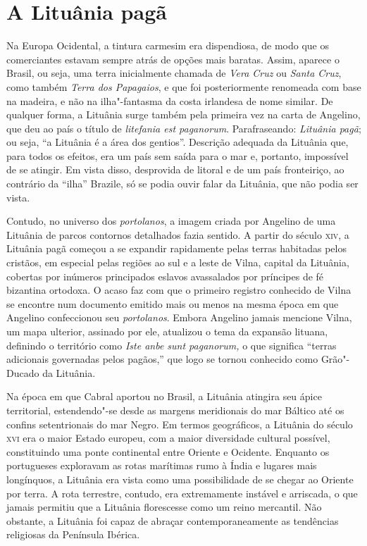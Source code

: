 \section*{A Lituânia pagã}

Na Europa
Ocidental, a tintura carmesim era dispendiosa, de modo que os
comerciantes estavam sempre atrás de opções mais baratas. Assim, aparece
o Brasil, ou seja, uma terra inicialmente chamada de \textit{Vera Cruz} ou
\textit{Santa Cruz}, como também \textit{Terra dos Papagaios}, e que foi
posteriormente renomeada com base na madeira, e não na ilha"-fantasma da
costa irlandesa de nome similar. De qualquer forma, a Lituânia surge
também pela primeira vez na carta de Angelino, que deu ao país o título
de \textit{litefania est paganorum}. Parafraseando: \textit{Lituânia
pagã}; ou seja, ``a Lituânia é a área dos gentios''. Descrição
adequada da Lituânia que, para todos os efeitos, era um país sem saída
para o mar e, portanto, impossível de se atingir. Em vista disso,
desprovida de litoral e de um país fronteiriço, ao contrário da ``ilha''
Brazile, só se podia ouvir falar da Lituânia, que não podia ser vista.

Contudo, no universo dos \textit{portolanos}, a imagem criada por Angelino de uma
Lituânia de parcos contornos detalhados fazia sentido. A partir do
século \textsc{xiv}, a Lituânia pagã começou a se expandir rapidamente pelas
terras habitadas pelos cristãos, em especial pelas regiões ao sul e a
leste de Vilna, capital da Lituânia, cobertas por inúmeros principados
eslavos avassalados por príncipes de fé bizantina ortodoxa. O acaso faz
com que o primeiro registro conhecido de Vilna se encontre num documento
emitido mais ou menos na mesma época em que Angelino confeccionou seu
\textit{portolanos}. Embora Angelino jamais mencione Vilna, um mapa ulterior,
assinado por ele, atualizou o tema da expansão lituana, definindo o
território como \textit{Iste anbe sunt paganorum,} o que significa
``terras adicionais governadas pelos pagãos,'' que logo se tornou
conhecido como Grão"-Ducado da Lituânia. 

Na época em que Cabral aportou
no Brasil, a Lituânia atingira seu ápice territorial, estendendo"-se
desde as margens meridionais do mar Báltico até os confins setentrionais
do mar Negro. Em termos geográficos, a Lituânia do século \textsc{xvi} era o maior
Estado europeu, com a maior diversidade cultural possível, constituindo
uma ponte continental entre Oriente e Ocidente. Enquanto os portugueses
exploravam as rotas marítimas rumo à Índia e lugares mais longínquos, a
Lituânia era vista como uma possibilidade de se chegar ao Oriente por
terra. A rota terrestre, contudo, era extremamente instável e arriscada,
o que jamais permitiu que a Lituânia florescesse como um reino
mercantil. Não obstante, a Lituânia foi capaz de abraçar
contemporaneamente as tendências religiosas da Península Ibérica.

